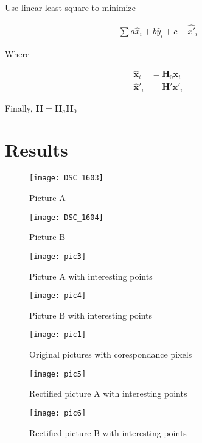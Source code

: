 \documentclass[11pt]{article}
\begin{document}
Use linear least-square to minimize 

\begin{align*}
\sum a \hat{x}_i + b \hat{y}_i + c -  \hat{x'}_i
\end{align*}

Where 

\begin{align*}
\mathbf{\hat{x}}_i &= \mathbf{H}_0 \mathbf{x}_i \\
\mathbf{\hat{x}'}_i &= \mathbf{H'} \mathbf{x'}_i
\end{align*}

Finally, $\mathbf{H} =\mathbf{H}_a \mathbf{H}_0 $



\section*{Results}

\begin{figure}[H]
\centering
\texttt{[image: DSC\_1603]}
\caption{Picture A}
\label{}
\end{figure}

\begin{figure}[H]
\centering
\texttt{[image: DSC\_1604]}
\caption{Picture B}
\label{}
\end{figure}

\begin{figure}[H]
\centering
\texttt{[image: pic3]}
\caption{Picture A with interesting points}
\label{}
\end{figure}

\begin{figure}[H]
\centering
\texttt{[image: pic4]}
\caption{Picture B with interesting points}
\label{}
\end{figure}

\begin{figure}[H]
\centering
\texttt{[image: pic1]}
\caption{Original pictures with corespondance pixels}
\label{}
\end{figure}

\begin{figure}[H]
\centering
\texttt{[image: pic5]}
\caption{Rectified picture A with interesting points}
\label{}
\end{figure}

\begin{figure}[H]
\centering
\texttt{[image: pic6]}
\caption{Rectified picture B with interesting points}
\label{}
\end{figure}
\end{document}
